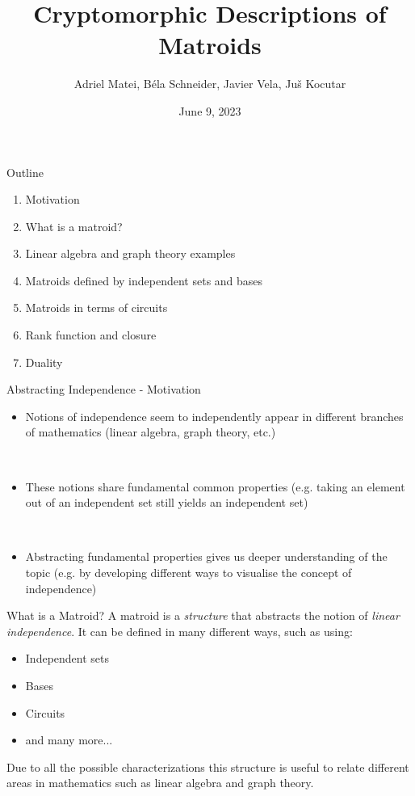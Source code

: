\documentclass{beamer}
\title{Cryptomorphic Descriptions of Matroids}
\author{Adriel Matei, Béla Schneider, Javier Vela, Juš Kocutar}
\institute{Presenting: Javier, Juš}
\date{June 9, 2023}
\begin{document}
\maketitle

\begin{frame}{Outline}
    \begin{enumerate}[<+->]
        \item Motivation
        \item What is a matroid?
        \item Linear algebra and graph theory examples
        \item Matroids defined by independent sets and bases
        \item Matroids in terms of circuits
        \item Rank function and closure 
        \item Duality 
   
    \end{enumerate}
\end{frame}


\begin{frame}{Abstracting Independence - Motivation}
\begin{itemize}
    \item Notions of independence seem to independently appear in different branches of mathematics (linear algebra, graph theory, etc.)
    
    \,
    \pause
    \item These notions share fundamental common properties (e.g. taking an element out of an independent set still yields an independent set)

    \,
    \pause
    \item Abstracting fundamental properties gives us deeper understanding of the topic (e.g. by developing different ways to visualise the concept of independence)
\end{itemize}    
\end{frame}

\begin{frame}{What is a Matroid?}
    A matroid is a \textit{structure} that  abstracts the notion of \textit{linear independence}.
    It can be defined in many different ways, such as using:
    \pause
    \begin{itemize}
        \item Independent sets
        \item Bases
        \item Circuits
        \item and many more...
    \end{itemize}
    \pause
    Due to all the possible characterizations this structure is useful to relate different areas in mathematics such as linear algebra and graph theory.
\end{frame}
\end{document}
